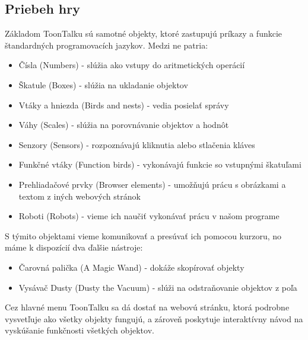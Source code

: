 \documentclass[slovak,a4paper,11pt]{article}
\begin{document}
\subsection{Priebeh hry}
Základom ToonTalku sú samotné objekty, ktoré zastupujú príkazy a funkcie štandardných programovacích jazykov. Medzi ne patria:
\begin{itemize}
\item Čísla (Numbers) - slúžia ako vstupy do aritmetických operácií
\item Škatule (Boxes) - slúžia na ukladanie objektov
\item Vtáky a hniezda (Birds and nests) - vedia posielať správy
\item Váhy (Scales) - slúžia na porovnávanie objektov a hodnôt
\item Senzory (Sensors) - rozpoznávajú kliknutia alebo stlačenia kláves
\item Funkčné vtáky (Function birds) - vykonávajú funkcie so vstupnými škatuľami
\item Prehliadačové prvky (Browser elements) - umožňujú prácu s obrázkami a textom z iných webových stránok
\item Roboti (Robots) - vieme ich naučiť vykonávať prácu v našom programe
\end{itemize}
S týmito objektami vieme komunikovať a presúvať ich pomocou kurzoru, no máme k dispozícií dva ďalšie nástroje:
\begin{itemize}
\item Čarovná palička (A Magic Wand) - dokáže skopírovať objekty
\item Vysávač Dusty (Dusty the Vacuum) - slúži na odstraňovanie objektov z poľa
\end{itemize}
Cez hlavné menu ToonTalku sa dá dostať na webovú stránku, ktorá podrobne vysvetľuje ako všetky objekty fungujú, a zároveň poskytuje interaktívny návod na vyskúšanie funkčnosti všetkých objektov.
\end{document}
